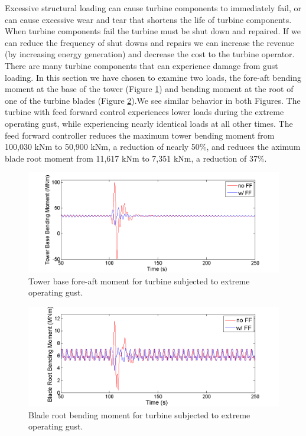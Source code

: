 Excessive structural loading can cause turbine components to immediately fail, or can cause excessive wear and tear that shortens the life of turbine components. When turbine components fail the turbine must be shut down and repaired. If we can reduce the frequency of shut downs and repairs we can increase the revenue (by increasing energy generation) and decrease the cost to the turbine operator. There are many turbine components that can experience damage from gust loading. In this section we have chosen to examine two loads, the fore-aft bending moment at the base of the tower (Figure \ref{fig3-16}) and bending moment at the root of one of the turbine blades (Figure \ref{fig3-17}).We see similar behavior in both Figures. The turbine with feed forward control experiences lower loads during the extreme operating gust, while experiencing nearly identical loads at all other times. The feed forward controller reduces the maximum tower bending moment from 100,030 kNm to 50,900 kNm, a reduction of nearly 50$\%$, and reduces the aximum blade root moment from 11,617 kNm to 7,351 kNm, a reduction of 37$\%$.

\begin{figure}[htbp]
	\centering
		\includegraphics[trim = {1cm 0 2cm 0}, clip, width = \linewidth]{Figures/ch3Figures/fig3-16.png}
		
	\caption{Tower base fore-aft moment for turbine subjected to extreme operating gust.}
	\label{fig3-16}
\end{figure}

\begin{figure}[htbp]
	\centering
		\includegraphics[trim = {1cm 0 2cm 0}, clip, width = \linewidth]{Figures/ch3Figures/fig3-17.png}
		
	\caption{Blade root bending moment for turbine subjected to extreme operating gust.}
	\label{fig3-17}
\end{figure}

